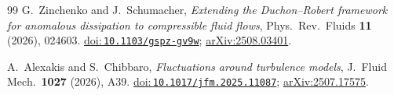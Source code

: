 \documentclass[12pt,a4paper]{article}
\newcommand{\doilink}[1]{\href{https://doi.org/#1}{doi:\,\nolinkurl{#1}}}
\theoremstyle{breakdef}
\theoremstyle{breakplain}
\theoremstyle{breakdef}
\begin{document}
\begin{thebibliography}{99}
G.~Zinchenko and J.~Schumacher,
\emph{Extending the Duchon--Robert framework for anomalous dissipation to compressible fluid flows},
Phys.\ Rev.\ Fluids \textbf{11} (2026), 024603.
\doilink{10.1103/gspz-gv9w};
\href{https://arxiv.org/abs/2508.03401}{arXiv:2508.03401}.

A.~Alexakis and S.~Chibbaro,
\emph{Fluctuations around turbulence models},
J.~Fluid Mech.\ \textbf{1027} (2026), A39.
\doilink{10.1017/jfm.2025.11087};
\href{https://arxiv.org/abs/2507.17575}{arXiv:2507.17575}.

\end{thebibliography}
\end{document}
